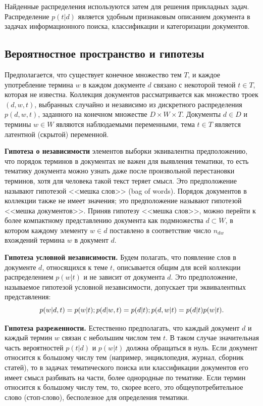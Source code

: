\documentclass[article, 10pt]{disser}
\begin{document}
Найденные распределения используются затем для решения прикладных задач.
Распределение $p(t| d)$ является удобным признаковым описанием документа в задачах информационного поиска, классификации и категоризации документов.

\subsection{Вероятностное пространство и гипотезы}
Предполагается, что существует конечное множество тем $T$, и каждое употребление термина $w$ в каждом документе $d$ связано с некоторой темой $t \in T$, которая не известна. Коллекция документов рассматривается как множество троек $(d, w, t)$, выбранных случайно и независимо из дискретного распределения $p(d, w, t)$, заданного на конечном множестве $D \times W \times T$. Документы $d \in D$ и термины $w \in W$ являются наблюдаемыми переменными, тема $t \in T$ является латентной (скрытой) переменной.

\textbf{Гипотеза о независимости} элементов выборки эквивалентна предположению, что порядок терминов в документах не важен для выявления тематики, то есть тематику документа можно узнать даже после произвольной перестановки терминов, хотя для человека такой текст теряет смысл. Это предположение называют гипотезой <<мешка слов>> (bag of words). Порядок документов в коллекции также не имеет значения; это предположение называют гипотезой <<мешка документов>>. Приняв гипотезу <<мешка слов>>, можно перейти к более компактному представлению документа как подмножества $d \subset W$, в котором каждому элементу $w \in d$ поставлено в соответствие число $n_{dw}$ вхождений термина $w$ в документ $d$.

\textbf{Гипотеза условной независимости.} Будем полагать, что появление слов в документе $d$, относящихся к теме $t$, описывается общим для всей коллекции распределением $p(w |t)$ и не зависит от документа $d$. Это предположение, называемое гипотезой условной независимости, допускает три эквивалентных представления:
\begin{equation}
    p(w | d, t) = p(w |t);\\
    p(d |w, t) = p(d |t);\\
    p(d, w |t) = p(d |t)p(w |t).
\end{equation}

\textbf{Гипотеза разреженности.} Естественно предполагать, что каждый документ $d$ и каждый термин $w$ связан с небольшим числом тем $t$. В таком случае значительная часть вероятностей $p(t| d)$ и $p(w |t)$ должна обращаться в нуль. Если документ относится к большому числу тем (например, энциклопедия, журнал, сборник статей), то в задачах тематического поиска или классификации документов его имеет смысл разбивать на части, более однородные по тематике. Если термин относится к большому числу тем, то, скорее всего, это общеупотребительное слово (стоп-слово), бесполезное для определения тематики.
\end{document}
